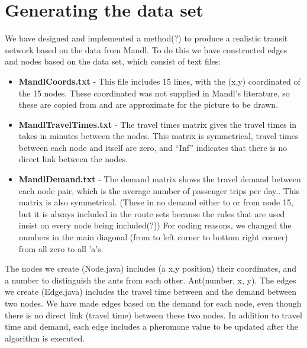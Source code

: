 \section{Generating the data set}


We have designed and implemented a method(?) to produce a realistic transit network based on the data from Mandl. 
To do this we have constructed edges and nodes based on the data set, which consist of text files:

\begin{itemize}
\item \textbf{MandlCoords.txt} - This file includes 15 lines, with the (x,y) coordinated of the 15 nodes. These coordinated was not supplied in Mandl's literature, so these are copied from \citet{fan09} and are approximate for the picture to be drawn.

\begingroup
\obeyspaces\obeylines
%
\endgroup%

\item \textbf{MandlTravelTimes.txt} - The travel times matrix gives the travel times in takes in minutes between the nodes. This matrix is symmetrical, travel times between each node and itself are zero, and ``Inf'' indicates that there is no direct link between the nodes. 

\begingroup
\obeyspaces\obeylines
%
\endgroup%

\item \textbf{MandlDemand.txt} - The demand matrix shows the travel demand between each node pair, which is the average number of passenger trips per day.. This matrix is also symmetrical. (These in no demand either to or from node 15, but it is always included in the route sets because the rules that are used insist on every node being included(?)) For coding reasons, we changed the numbers in the main diagonal (from to left corner to bottom right corner) from all zero to all ’a’s. 

\begingroup
\obeyspaces\obeylines
%
\endgroup%

\end{itemize}

The nodes we create (Node.java) includes (a x,y position) their coordinates, and a number to distinguish the ants from each other. Ant(number, x, y).
The edges we create (Edge.java) includes the travel time between and the demand between two nodes. We have made edges based on the demand for each node, even though there is no direct link (travel time) between these two nodes. %
In addition to travel time and demand, each edge includes a pheromone value to be updated after the algorithm is executed.
